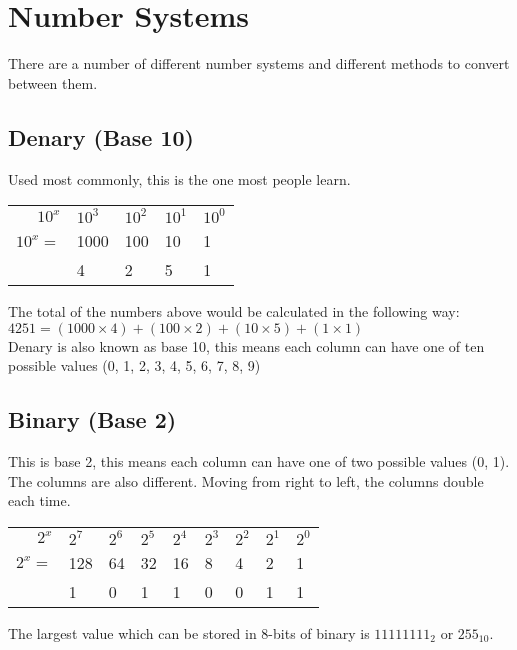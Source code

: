 
\section*{Number Systems}
There are a number of different number systems and different methods to convert between them. 
\subsection*{Denary (Base 10)}
Used most commonly, this is the one most people learn.
\begin{table}[H]
    \centering
    \begin{tabularx}{0.4\linewidth}{r||X | X | X | X}
        $10^x$ & $10^3$ & $10^2$ & $10^1$ & $10^0$\\
        $10^x=$& 1000 & 100 & 10 & 1 \\
        \hline
        & 4 & 2 & 5 & 1
    \end{tabularx}
\end{table}
\noindent The total of the numbers above would be calculated in the following way:\\
$4251=(1000\times 4) + (100 \times 2) + (10 \times 5) + (1 \times 1)$\\
Denary is also known as base 10, this means each column can have one of ten possible values (0, 1, 2, 3, 4, 5, 6, 7, 8, 9)
\subsection*{Binary (Base 2)}
This is base 2, this means each column can have one of two possible values (0, 1). The columns are also different. Moving from right to left, the columns double each time.
\begin{table}[H]
    \centering
    \begin{tabularx}{0.6\linewidth}{r||X | X | X | X | X | X | X | X}
        $2^{x}$ & $2^7$ & $2^6$ & $2^5$ & $2^4$ & $2^3$ & $2^2$ & $2^1$ & $2^0$\\
        $2^x=$ & 128 & 64 & 32 & 16 & 8 & 4 & 2 & 1 \\
        \hline
        & 1 & 0 & 1 & 1 & 0 & 0 & 1 & 1
    \end{tabularx}
\end{table}
\noindent The largest value which can be stored in 8-bits of binary is $11111111_2$ or $255_{10}$.
